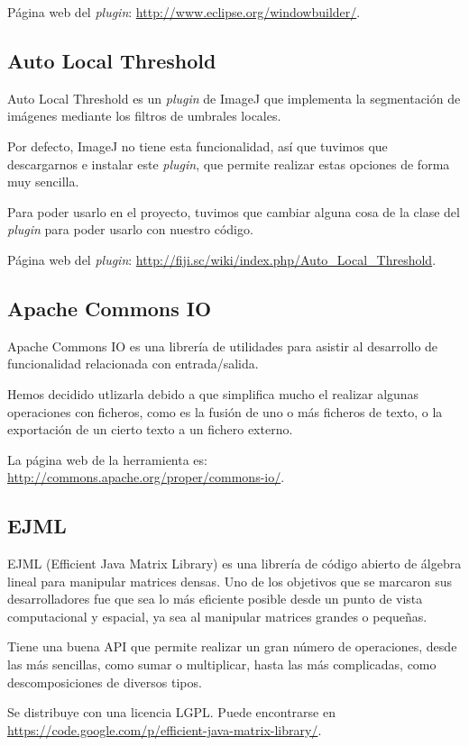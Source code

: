 Página web del \textit{plugin}: \url{http://www.eclipse.org/windowbuilder/}.

\subsection{Auto Local Threshold}
Auto Local Threshold es un \textit{plugin} de ImageJ que implementa la segmentación de imágenes mediante los filtros de umbrales locales.

Por defecto, ImageJ no tiene esta funcionalidad, así que tuvimos que descargarnos e instalar este \textit{plugin}, que permite realizar estas opciones de forma muy sencilla.

Para poder usarlo en el proyecto, tuvimos que cambiar alguna cosa de la clase del \textit{plugin} para poder usarlo con nuestro código.

Página web del \textit{plugin}: \url{http://fiji.sc/wiki/index.php/Auto_Local_Threshold}.

\subsection{Apache Commons IO}
Apache Commons IO es una librería de utilidades para asistir al desarrollo de funcionalidad relacionada con entrada/salida.

Hemos decidido utlizarla debido a que simplifica mucho el realizar algunas operaciones con ficheros, como es la fusión de uno o más ficheros de texto, o la exportación de un cierto texto a un fichero externo.

La página web de la herramienta es: \url{http://commons.apache.org/proper/commons-io/}.

\subsection{EJML}
EJML (Efficient Java Matrix Library) es una librería de código abierto de álgebra lineal para manipular matrices densas. Uno de los objetivos que se marcaron sus desarrolladores fue que sea lo más eficiente posible desde un punto de vista computacional y espacial, ya sea al manipular matrices grandes o pequeñas.

Tiene una buena API que permite realizar un gran número de operaciones, desde las más sencillas, como sumar o multiplicar, hasta las más complicadas, como descomposiciones de diversos tipos.

Se distribuye con una licencia LGPL. Puede encontrarse en \url{https://code.google.com/p/efficient-java-matrix-library/}.

